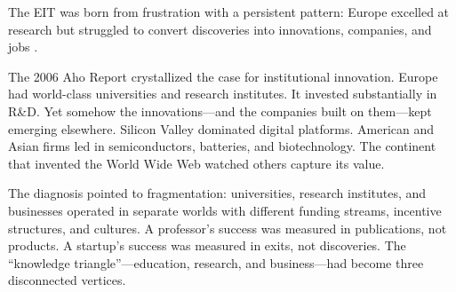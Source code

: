 \documentclass[../main.tex]{subfiles}
\begin{document}
The EIT was born from frustration with a persistent pattern: Europe excelled at research but struggled to convert discoveries into innovations, companies, and jobs \cite{etzkowitz2000dynamics}.

The 2006 Aho Report crystallized the case for institutional innovation. Europe had world-class universities and research institutes. It invested substantially in R\&D. Yet somehow the innovations---and the companies built on them---kept emerging elsewhere. Silicon Valley dominated digital platforms. American and Asian firms led in semiconductors, batteries, and biotechnology. The continent that invented the World Wide Web watched others capture its value.

The diagnosis pointed to fragmentation: universities, research institutes, and businesses operated in separate worlds with different funding streams, incentive structures, and cultures. A professor's success was measured in publications, not products. A startup's success was measured in exits, not discoveries. The ``knowledge triangle''---education, research, and business---had become three disconnected vertices.

\begin{center}
\end{center}
\end{document}
